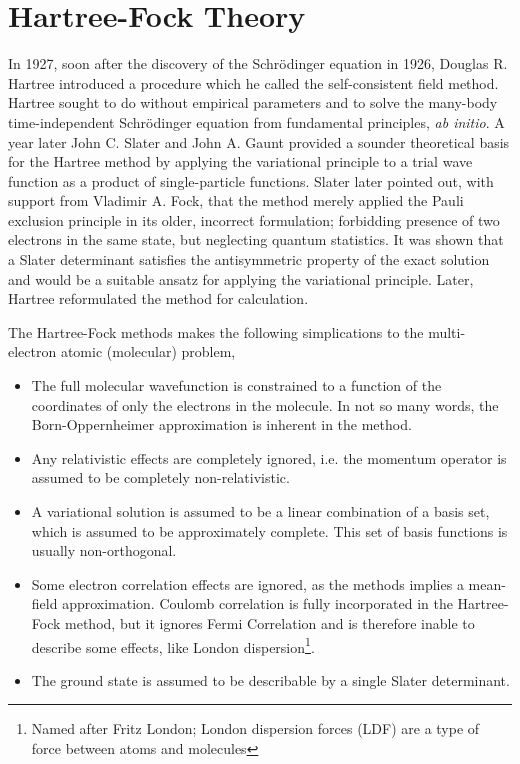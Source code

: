 \chapter{Hartree-Fock Theory} 

    In 1927, soon after the discovery of the Schrödinger equation in 1926, Douglas R.
    Hartree introduced a procedure which he called the self-consistent field 
    method\cite{hartree1928wave}. 
    Hartree sought to do without empirical parameters and
    to solve the many-body time-independent Schrödinger equation from fundamental
    principles, \emph{ab initio}. A year later John C. Slater and John A. Gaunt 
    provided a sounder theoretical basis for the Hartree method by applying the 
    variational principle to a trial wave function as a product of single-particle
    functions\cite{slater1928self}\cite{gaunt1928theory}. 
    Slater later pointed out, with support from Vladimir A. Fock, that the method
    merely applied the Pauli exclusion principle in its older, incorrect formulation;
    forbidding presence of two electrons in the same state, but neglecting 
    quantum statistics\cite{slater1930note}\cite{fock1930naherungsmethode}. It was
    shown that a Slater determinant satisfies the antisymmetric property of the
    exact solution and would be a suitable ansatz for applying the variational
    principle. Later, Hartree reformulated the method for 
    calculation\cite{hartree1935self}.

    The Hartree-Fock methods makes the following simplications to the multi-electron 
    atomic (molecular) problem,
    \begin{itemize}
        \item The full molecular wavefunction is constrained to a function of the
            coordinates of only the electrons in the molecule. In not so many words,
            the Born-Oppernheimer approximation is inherent in the method.
        \item Any relativistic effects are completely ignored, i.e. the momentum
            operator is assumed to be completely non-relativistic.
        \item A variational solution is assumed to be a linear combination of a basis
            set, which is assumed to be approximately complete. This set of basis
            functions is usually non-orthogonal.
        \item Some electron correlation effects are ignored, as the methods implies
            a mean-field approximation. Coulomb correlation is fully incorporated 
            in the Hartree-Fock method, but it ignores Fermi Correlation and is
            therefore inable to describe some effects, like London 
            dispersion\footnote{Named after Fritz London; London dispersion
            forces (LDF) are a type of force between atoms and 
            molecules\cite{heitler1927wechselwirkung}}.
        \item The ground state is assumed to be describable by a single 
            Slater determinant. 
    \end{itemize}

